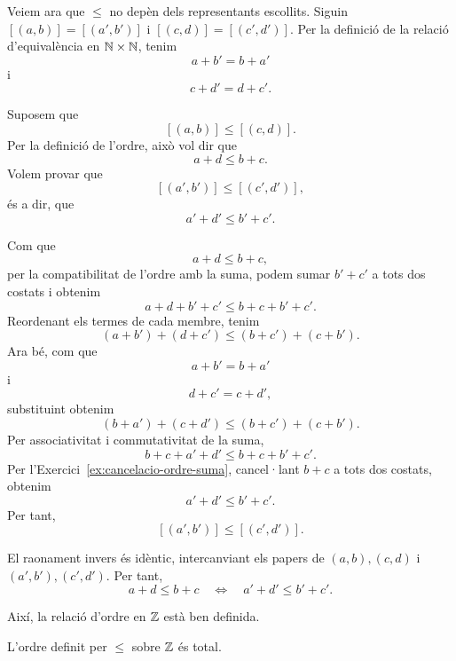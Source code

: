 \begin{prova}
Veiem ara que $\leq$ no depèn dels representants escollits. Siguin $[(a,b)]=[(a',b')]$ i $[(c,d)]=[(c',d')]$. Per la definició de la relació d'equivalència en $\mathbb{N}\times\mathbb{N}$, tenim
\[
a+b'=b+a'
\]
i
\[
c+d'=d+c'.
\]

Suposem que
\[
[(a,b)]\leq [(c,d)].
\]
Per la definició de l'ordre, això vol dir que
\[
a+d\leq b+c.
\]
Volem provar que
\[
[(a',b')]\leq [(c',d')],
\]
és a dir, que
\[
a'+d'\leq b'+c'.
\]

Com que
\[
a+d\leq b+c,
\]
per la compatibilitat de l'ordre amb la suma, podem sumar $b'+c'$ a tots dos costats i obtenim
\[
a+d+b'+c'\leq b+c+b'+c'.
\]
Reordenant els termes de cada membre, tenim
\[
(a+b')+(d+c')\leq (b+c')+(c+b').
\]
Ara bé, com que
\[
a+b'=b+a'
\]
i
\[
d+c'=c+d',
\]
substituint obtenim
\[
(b+a')+(c+d')\leq (b+c')+(c+b').
\]
Per associativitat i commutativitat de la suma,
\[
b+c+a'+d'\leq b+c+b'+c'.
\]
Per l’Exercici~\ref{ex:cancelacio-ordre-suma}, cancel·lant $b+c$ a tots dos costats, obtenim
\[
a'+d'\leq b'+c'.
\]
Per tant,
\[
[(a',b')]\leq [(c',d')].
\]

El raonament invers és idèntic, intercanviant els papers de $(a,b),(c,d)$ i $(a',b'),(c',d')$. Per tant,
\[
a+d\leq b+c
\quad\Longleftrightarrow\quad
a'+d'\leq b'+c'.
\]

Així, la relació d'ordre en $\mathbb{Z}$ està ben definida.
\end{prova}

\begin{proposicio}
L'ordre definit per $\leq$ sobre $\mathbb{Z}$ és total.
\end{proposicio}

